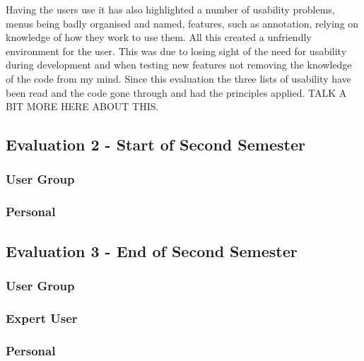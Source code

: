 Having the users use it has also highlighted a number of usability problems, menus being badly organised and named, features, such as annotation, relying on knowledge of how they work to use them.  All this created a unfriendly environment for the user.  This was due to losing sight of the need for usability during development and when testing new features not removing the knowledge of the code from my mind.  Since this evaluation the three lists of usability have been read and the code gone through and had the principles applied.  TALK A BIT MORE HERE ABOUT THIS.

\subsection{Evaluation 2 - Start of Second Semester}
\subsubsection{User Group}
\subsubsection{Personal}

\subsection{Evaluation 3 - End of Second Semester}
\subsubsection{User Group}
\subsubsection{Expert User}
\subsubsection{Personal}
